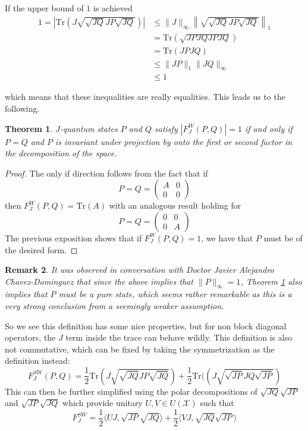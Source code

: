 \documentclass{amsart}
\numberwithin{equation}{section}
\newtheorem{theorem}{Theorem}[section]
\newtheorem{remark}[theorem]{Remark}
\theoremstyle{definition}
\theoremstyle{plain}
\theoremstyle{solutionstyle}
\begin{document}
If the upper bound of $1$ is achieved 
\begin{align*}
1=\left|\mathrm{Tr}\left(J\sqrt{\sqrt{JQ}JP\sqrt{JQ}}\right)\right|&\leq \|J\|_\infty \left\|\sqrt{\sqrt{JQ}JP\sqrt{JQ}}\right\|_1\\&=\mathrm{Tr}\left(\sqrt{JPJQJPJQ}\right)\\&=\mathrm{Tr}(JPJQ)\\&\leq\|JP\|_1\|JQ\|_\infty\\
&\leq 1
\end{align*}

which means that these inequalities are really equalities. This leads us to the following.
\begin{theorem}\label{pure state theorem}
    $J$-quantum states $P$ and $Q$ satisfy $|F_J^W(P,Q)|=1$ if and only if $P=Q$ and $P$ is invariant under projection by onto the first or second factor in the decomposition of the space. 
\end{theorem}
\begin{proof}
The only if direction follows from the fact that if \begin{equation*}P=Q= 
\begin{pmatrix}
A & 0 \\
0 & 0
\end{pmatrix}
\end{equation*} then $F_J^W(P,Q)=\mathrm{Tr}(A)$ with an analogous result holding for \begin{equation*}P=Q=\begin{pmatrix}
0 & 0 \\
0 & A
\end{pmatrix}\end{equation*} The previous exposition shows that if $F_J^W(P,Q)=1$, we have that $P$ must be of the desired form.
\end{proof}
\begin{remark}
It was observed in conversation with Doctor Javier Alejandro Chavez-Dominguez that since the above implies that $\|P\|_{\infty}=1$, Theorem \ref{pure state theorem} also implies that $P$ must be a pure state, which seems rather remarkable as this is a very strong conclusion from a seemingly weaker assumption.
\end{remark}
 

So we see this definition has some nice properties, but for non block diagonal operators, the $J$ term inside the trace can behave wildly. This definition is also not commutative, which can be fixed by taking the symmetrization as the definition instead:
\begin{equation*}F_J^{SW}(P,Q)=\frac{1}{2}\mathrm{Tr}(J\sqrt{\sqrt{JQ}JP\sqrt{JQ}})+\frac{1}{2}\mathrm{Tr}((J\sqrt{\sqrt{JP}JQ\sqrt{JP}})\end{equation*}
This can then be further simplified using the polar decompositions of $\sqrt{JQ}\sqrt{JP}$ and $\sqrt{JP}\sqrt{JQ}$ which provide unitary $U,V\in U(\mathcal{X})$ such that 
\begin{equation*}F_J^{SW}=\frac{1}{2}\langle UJ,\sqrt{JP}\sqrt{JQ}\rangle+\frac{1}{2}\langle VJ,\sqrt{JQ}\sqrt{JP}\rangle\end{equation*}
\end{document}

